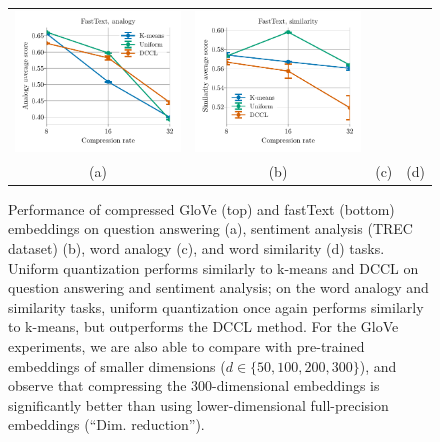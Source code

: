 \begin{figure}
\begin{tabular}{@{\hskip -0.0in}c@{\hskip -0.0in}c@{\hskip -0.0in}c@{\hskip -0.0in}c@{\hskip -0.0in}}
		\includegraphics[width=.245\linewidth]{figures/fasttext1m_intrinsics_analogy-avg-score_vs_compression_linx.pdf} &
		\includegraphics[width=.245\linewidth]{figures/fasttext1m_intrinsics_similarity-avg-score_vs_compression_linx.pdf} \\
		\;\;\;\;\;(a) & \;\;\;\;\;\;(b) & \;\;\;\;\;\;(c) & \;\;\;\;\;\;(d)
	\end{tabular}
\caption{Performance of compressed GloVe (top) and fastText (bottom) embeddings on question answering (a), sentiment analysis (TREC dataset) (b), word analogy (c), and word similarity (d) tasks.
Uniform quantization performs similarly to k-means and DCCL on question answering and sentiment analysis;
on the word analogy and similarity tasks, uniform quantization once again performs similarly to k-means, but outperforms the DCCL method.
For the GloVe experiments, we are also able to compare with pre-trained embeddings of smaller dimensions ($d\in\{50,100,200,300\}$), and observe that compressing the 300-dimensional embeddings is significantly better than using lower-dimensional full-precision embeddings (``Dim. reduction'').
}
	\label{fig:perf_comp}
\end{figure}


